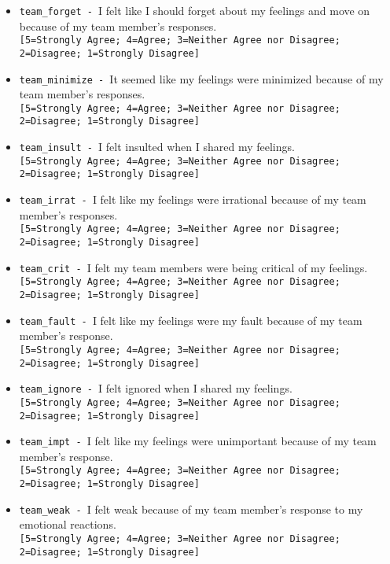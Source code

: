 \begin{description}
\begin{addmargin}[0em]{0em}
\begin{addmargin}[1em]{0em}
\begin{itemize}
            \item \verb|team_forget - |I felt like I should forget about my feelings and move on because of my team member's responses.\\\verb|[5=Strongly Agree; 4=Agree; 3=Neither Agree nor Disagree; 2=Disagree; 1=Strongly Disagree]|
            \item \verb|team_minimize - |It seemed like my feelings were minimized because of my team member's responses.\\\verb|[5=Strongly Agree; 4=Agree; 3=Neither Agree nor Disagree; 2=Disagree; 1=Strongly Disagree]|
            \item \verb|team_insult - |I felt insulted when I shared my feelings.\\\verb|[5=Strongly Agree; 4=Agree; 3=Neither Agree nor Disagree; 2=Disagree; 1=Strongly Disagree]|
            \item \verb|team_irrat - |I felt like my feelings were irrational because of my team member's responses.\\\verb|[5=Strongly Agree; 4=Agree; 3=Neither Agree nor Disagree; 2=Disagree; 1=Strongly Disagree]|
            \item \verb|team_crit - |I felt my team members were being critical of my feelings.\\\verb|[5=Strongly Agree; 4=Agree; 3=Neither Agree nor Disagree; 2=Disagree; 1=Strongly Disagree]|
            \item \verb|team_fault - |I felt like my feelings were my fault because of my team member's response.\\\verb|[5=Strongly Agree; 4=Agree; 3=Neither Agree nor Disagree; 2=Disagree; 1=Strongly Disagree]|
            \item \verb|team_ignore - |I felt ignored when I shared my feelings.\\\verb|[5=Strongly Agree; 4=Agree; 3=Neither Agree nor Disagree; 2=Disagree; 1=Strongly Disagree]|
            \item \verb|team_impt - |I felt like my feelings were unimportant because of my team member's response.\\\verb|[5=Strongly Agree; 4=Agree; 3=Neither Agree nor Disagree; 2=Disagree; 1=Strongly Disagree]|
            \item \verb|team_weak - |I felt weak because of my team member's response to my emotional reactions.\\\verb|[5=Strongly Agree; 4=Agree; 3=Neither Agree nor Disagree; 2=Disagree; 1=Strongly Disagree]|
        \end{itemize}

\end{addmargin}
\end{addmargin}
\end{description}
